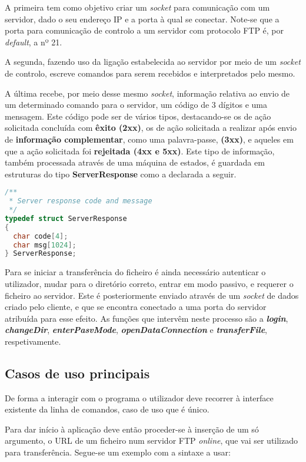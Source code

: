 \documentclass[a4paper, 11pt]{article}
\begin{document}
A primeira tem como objetivo criar um \textit{socket} para comunicação com um servidor, dado o seu endereço IP e a porta à qual se conectar. Note-se que a porta para comunicação de controlo a um servidor com protocolo FTP é, por \textit{default}, a nº 21.

A segunda, fazendo uso da ligação estabelecida ao servidor por meio de um \textit{socket} de controlo, escreve comandos para serem recebidos e interpretados pelo mesmo.

A última recebe, por meio desse mesmo \textit{socket}, informação relativa ao envio de um determinado comando para o servidor, um código de 3 dígitos e uma mensagem. Este código pode ser de vários tipos, destacando-se os de ação solicitada concluída com \textbf{êxito (2xx)}, os de ação solicitada a realizar após envio de \textbf{informação complementar}, como uma palavra-passe, \textbf{(3xx)}, e aqueles em que a ação solicitada foi \textbf{rejeitada (4xx e 5xx)}.
Este tipo de informação, também processada através de uma máquina de estados, é guardada em estruturas do tipo \textbf{ServerResponse} como a declarada a seguir.

\begin{lstlisting}[language=C]
/**
 * Server response code and message
 */
typedef struct ServerResponse
{
  char code[4];
  char msg[1024];
} ServerResponse;
\end{lstlisting}

Para se iniciar a transferência do ficheiro é ainda necessário autenticar o utilizador, mudar para o diretório correto, entrar em modo passivo, e requerer o ficheiro ao servidor. Este é posteriormente enviado através de um \textit{socket} de dados criado pelo cliente, e que se encontra conectado a uma porta do servidor atribuída para esse efeito. As funções que intervêm neste processo são a \textit{\textbf{login}}, \textit{\textbf{changeDir}}, \textit{\textbf{enterPasvMode}}, \textit{\textbf{openDataConnection}} e \textit{\textbf{transferFile}}, respetivamente.

\subsection{Casos de uso principais}

De forma a interagir com o programa o utilizador deve recorrer à interface existente da linha de comandos, caso de uso que é único.

Para dar início à aplicação deve então proceder-se à inserção de um só argumento, o URL de um ficheiro num servidor FTP \textit{online}, que vai ser utilizado para transferência. Segue-se um exemplo com a sintaxe a usar:
\end{document}
